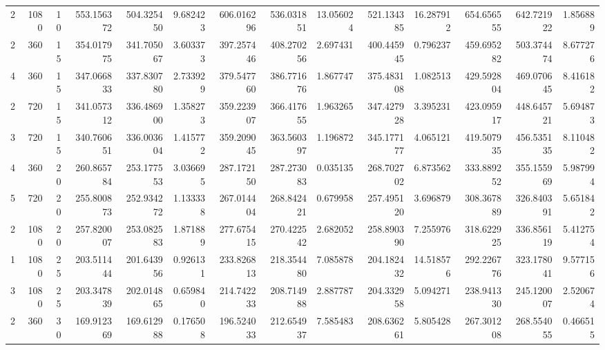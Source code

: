 \begin{tabular}{rrrrrrrrrrrrrr}
     2 &  1080 &    10 &    553.156372 &  504.325450 &        9.682423 &     606.016296 &  536.031851 &            13.056024 &     521.134385 &               16.287912 &    654.656555 &  642.721922 &        1.856889 \\
     2 &   360 &    15 &    354.017975 &  341.705067 &        3.603373 &     397.257446 &  408.270256 &             2.697431 &     400.445945 &                0.796237 &    459.695282 &  503.374474 &        8.677276 \\
     4 &   360 &    15 &    347.066833 &  337.830780 &        2.733929 &     379.547760 &  386.771676 &             1.867747 &     375.483108 &                1.082513 &    429.592804 &  469.070645 &        8.416182 \\
     2 &   720 &    15 &    341.057312 &  336.486900 &        1.358273 &     359.223907 &  366.417655 &             1.963265 &     347.427928 &                3.395231 &    423.095917 &  448.645721 &        5.694873 \\
     3 &   720 &    15 &    340.760651 &  336.003604 &        1.415772 &     359.209045 &  363.560397 &             1.196872 &     345.177177 &                4.065121 &    419.507935 &  456.535135 &        8.110482 \\
     4 &   360 &    20 &    260.865784 &  253.177553 &        3.036695 &     287.172150 &  287.273083 &             0.035135 &     268.702702 &                6.873562 &    333.889252 &  355.155969 &        5.987994 \\
     5 &   720 &    20 &    255.800873 &  252.934272 &        1.133338 &     267.014404 &  268.842421 &             0.679958 &     257.495120 &                3.696879 &    308.367889 &  326.840391 &        5.651842 \\
     2 &  1080 &    20 &    257.820007 &  253.082583 &        1.871889 &     277.675415 &  270.422542 &             2.682052 &     258.890390 &                7.255976 &    318.622925 &  336.856119 &        5.412754 \\
     1 &  1080 &    25 &    203.511444 &  201.643956 &        0.926131 &     233.826813 &  218.354480 &             7.085878 &     204.182432 &               14.518576 &    292.226776 &  323.178041 &        9.577156 \\
     3 &  1080 &    25 &    203.347839 &  202.014865 &        0.659840 &     214.742233 &  208.714988 &             2.887787 &     204.332958 &                5.094271 &    238.941330 &  245.120007 &        2.520674 \\
     2 &   360 &    30 &    169.912369 &  169.612988 &        0.176508 &     196.524033 &  212.654937 &             7.585483 &     208.636261 &                5.805428 &    267.301208 &  268.554055 &        0.466515 \\

\end{tabular}
